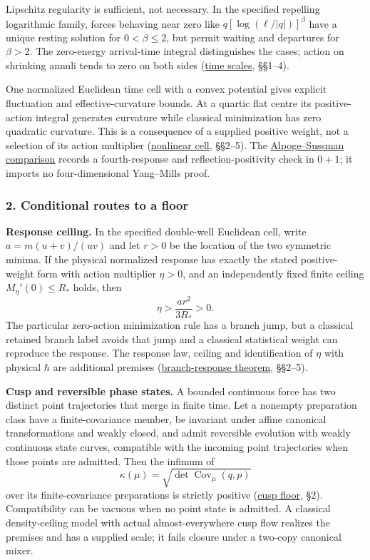 \documentclass[11pt,a4paper]{article}
\begin{document}
Lipschitz regularity is sufficient, not necessary. In the specified
repelling logarithmic family, forces behaving near zero like
\(q[\log(\ell/|q|)]^\beta\) have a unique resting solution for
\(0<\beta\le2\), but permit waiting and departures for \(\beta>2\). The
zero-energy arrival-time integral distinguishes the cases; action on
shrinking annuli tends to zero on both sides
(\href{newton-continuity-time-scales.md}{time scales}, §§1--4).

One normalized Euclidean time cell with a convex potential gives
explicit fluctuation and effective-curvature bounds. At a quartic flat
centre its positive-action integral generates curvature while classical
minimization has zero quadratic curvature. This is a consequence of a
supplied positive weight, not a selection of its action multiplier
(\href{newton-nonlinear-time-cell.md}{nonlinear cell}, §§2--5). The
\href{alpoge-balaban-newton-peek.md}{Alpoge--Sussman comparison} records
a fourth-response and reflection-positivity check in \(0+1\); it imports
no four-dimensional Yang--Mills proof.

\hypertarget{conditional-routes-to-a-floor}{%
\subsubsection{2. Conditional routes to a
floor}\label{conditional-routes-to-a-floor}}

\textbf{Response ceiling.} In the specified double-well Euclidean cell,
write \(a=m(u+v)/(uv)\) and let \(r>0\) be the location of the two
symmetric minima. If the physical normalized response has exactly the
stated positive-weight form with action multiplier \(\eta>0\), and an
independently fixed finite ceiling \(M_\eta'(0)\le R_*\) holds, then
\[\eta>\frac{ar^2}{3R_*}>0.\] The particular zero-action minimization
rule has a branch jump, but a classical retained branch label avoids
that jump and a classical statistical weight can reproduce the response.
The response law, ceiling and identification of \(\eta\) with physical
\(\hbar\) are additional premises
(\href{newton-branch-response-action.md}{branch-response theorem},
§§2--5).

\textbf{Cusp and reversible phase states.} A bounded continuous force
has two distinct point trajectories that merge in finite time. Let a
nonempty preparation class have a finite-covariance member, be invariant
under affine canonical transformations and weakly closed, and admit
reversible evolution with weakly continuous state curves, compatible
with the incoming point trajectories when those points are admitted.
Then the infimum of
\[\kappa(\mu)=\sqrt{\det\operatorname{Cov}_\mu(q,p)}\] over its
finite-covariance preparations is strictly positive
(\href{newton-cusp-preparation-floor.md}{cusp floor}, §2). Compatibility
can be vacuous when no point state is admitted. A classical
density-ceiling model with actual almost-everywhere cusp flow realizes
the premises and has a supplied scale; it fails closure under a two-copy
canonical mixer.
\end{document}
